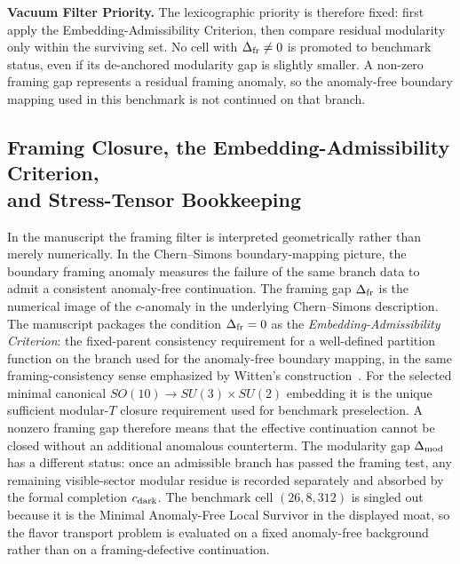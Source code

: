 \documentclass[11pt]{article}
\begin{document}
\medskip
\noindent\textbf{Vacuum Filter Priority.}
The lexicographic priority is therefore fixed: first apply the Embedding-Admissibility Criterion, then compare residual modularity only within the surviving set. No cell with $\Delta_{\rm fr}\neq0$ is promoted to benchmark status, even if its de-anchored modularity gap is slightly smaller. A non-zero framing gap represents a residual framing anomaly, so the anomaly-free boundary mapping used in this benchmark is not continued on that branch.

\subsection{Framing Closure, the Embedding-Admissibility Criterion,\\ and Stress-Tensor Bookkeeping}

In the manuscript the framing filter is interpreted geometrically rather than merely numerically. In the Chern--Simons boundary-mapping picture, the boundary framing anomaly measures the failure of the same branch data to admit a consistent anomaly-free continuation. The framing gap $\Delta_{\rm fr}$ is the numerical image of the $c$-anomaly in the underlying Chern--Simons description. The manuscript packages the condition $\Delta_{\rm fr}=0$ as the \emph{Embedding-Admissibility Criterion}: the fixed-parent consistency requirement for a well-defined partition function on the branch used for the anomaly-free boundary mapping, in the same framing-consistency sense emphasized by Witten's construction~\cite{witten1989}. For the selected minimal canonical $SO(10)\to SU(3)\times SU(2)$ embedding it is the unique sufficient modular-$T$ closure requirement used for benchmark preselection. A nonzero framing gap therefore means that the effective continuation cannot be closed without an additional anomalous counterterm. The modularity gap $\Delta_{\rm mod}$ has a different status: once an admissible branch has passed the framing test, any remaining visible-sector modular residue is recorded separately and absorbed by the formal completion $c_{\rm dark}$. The benchmark cell $(26,8,312)$ is singled out because it is the Minimal Anomaly-Free Local Survivor in the displayed moat, so the flavor transport problem is evaluated on a fixed anomaly-free background rather than on a framing-defective continuation.
\end{document}
